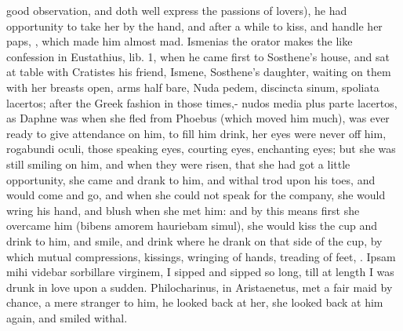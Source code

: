 {good observation, and doth well express the passions of lovers), he had
opportunity to take her by the hand, and after a while to kiss, and
handle her paps, \etc{},  which made him almost mad. Ismenias the
orator makes the like confession in Eustathius, lib. 1, when he came
first to Sosthene's house, and sat at table with Cratistes his friend,
Ismene, Sosthene's daughter, waiting on them with her breasts open,
arms half bare, Nuda pedem, discincta sinum, spoliata lacertos;
after the Greek fashion in those times,- nudos media plus parte
lacertos, as Daphne was when she fled from Phoebus (which moved him
much), was ever ready to give attendance on him, to fill him drink, her
eyes were never off him, rogabundi oculi, those speaking eyes, courting
eyes, enchanting eyes; but she was still smiling on him, and when they
were risen, that she had got a little opportunity, she came and
drank to him, and withal trod upon his toes, and would come and go, and
when she could not speak for the company, she would wring his hand, and
blush when she met him: and by this means first she overcame him
(bibens amorem hauriebam simul), she would kiss the cup and drink to
him, and smile, and drink where he drank on that side of the cup, by
which mutual compressions, kissings, wringing of hands, treading of
feet, \etc{}. Ipsam mihi videbar sorbillare virginem, I sipped and sipped
so long, till at length I was drunk in love upon a sudden.
Philocharinus, in  Aristaenetus, met a fair maid by chance, a
mere stranger to him, he looked back at her, she looked back at him
again, and smiled withal.

}
